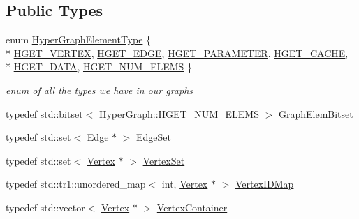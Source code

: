 \subsection*{Public Types}
\begin{DoxyCompactItemize}
\item 
enum \hyperlink{classg2o_1_1HyperGraph_af603119d5d3475aed6e34ee9d701b69e}{Hyper\+Graph\+Element\+Type} \{ \\*
\hyperlink{classg2o_1_1HyperGraph_af603119d5d3475aed6e34ee9d701b69ea4a278c79154a0d4c381a7e265d7048f5}{H\+G\+E\+T\+\_\+\+V\+E\+R\+T\+EX}, 
\hyperlink{classg2o_1_1HyperGraph_af603119d5d3475aed6e34ee9d701b69ea32ab1204ad3640d91c59ce6fffe2e580}{H\+G\+E\+T\+\_\+\+E\+D\+GE}, 
\hyperlink{classg2o_1_1HyperGraph_af603119d5d3475aed6e34ee9d701b69eaec8dd0de424ff24a18d3ba5ed3864f79}{H\+G\+E\+T\+\_\+\+P\+A\+R\+A\+M\+E\+T\+ER}, 
\hyperlink{classg2o_1_1HyperGraph_af603119d5d3475aed6e34ee9d701b69eafdb05add70f035dced2b173de8431408}{H\+G\+E\+T\+\_\+\+C\+A\+C\+HE}, 
\\*
\hyperlink{classg2o_1_1HyperGraph_af603119d5d3475aed6e34ee9d701b69eac780d65b4de763d230e9cad4378c46fa}{H\+G\+E\+T\+\_\+\+D\+A\+TA}, 
\hyperlink{classg2o_1_1HyperGraph_af603119d5d3475aed6e34ee9d701b69eafe77ef3192f9be61982957b0a3e2f6a6}{H\+G\+E\+T\+\_\+\+N\+U\+M\+\_\+\+E\+L\+E\+MS}
 \}\begin{DoxyCompactList}\small\item\em enum of all the types we have in our graphs \end{DoxyCompactList}
\item 
typedef std\+::bitset$<$ \hyperlink{classg2o_1_1HyperGraph_af603119d5d3475aed6e34ee9d701b69eafe77ef3192f9be61982957b0a3e2f6a6}{Hyper\+Graph\+::\+H\+G\+E\+T\+\_\+\+N\+U\+M\+\_\+\+E\+L\+E\+MS} $>$ \hyperlink{classg2o_1_1HyperGraph_a7b8fda20e1b03e92aeceeac6e8218b73}{Graph\+Elem\+Bitset}
\item 
typedef std\+::set$<$ \hyperlink{classg2o_1_1HyperGraph_1_1Edge}{Edge} $\ast$ $>$ \hyperlink{classg2o_1_1HyperGraph_a5e2970e236c0dcb4eff7c205d7b6b4ae}{Edge\+Set}
\item 
typedef std\+::set$<$ \hyperlink{classg2o_1_1HyperGraph_1_1Vertex}{Vertex} $\ast$ $>$ \hyperlink{classg2o_1_1HyperGraph_a703938cdb4bb636860eed55a2489d70c}{Vertex\+Set}
\item 
typedef std\+::tr1\+::unordered\+\_\+map$<$ int, \hyperlink{classg2o_1_1HyperGraph_1_1Vertex}{Vertex} $\ast$ $>$ \hyperlink{classg2o_1_1HyperGraph_a97307eac064ebf4b3e2cfbf0718035b5}{Vertex\+I\+D\+Map}
\item 
typedef std\+::vector$<$ \hyperlink{classg2o_1_1HyperGraph_1_1Vertex}{Vertex} $\ast$ $>$ \hyperlink{classg2o_1_1HyperGraph_a9339534c99300a0ddac87ba976ef188c}{Vertex\+Container}
\end{DoxyCompactItemize}
